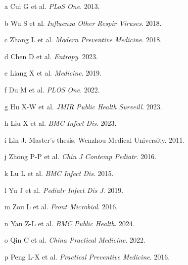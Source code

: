 \begin{landscape}
\begin{table}[htbp]
\begin{threeparttable}
\begin{tablenotes}[flushleft]
    \vspace{0.5em}
    \item [a] Cui G et al. \textit{PLoS One}. 2013. 
    \item [b] Wu S et al. \textit{Influenza Other Respir Viruses}. 2018.
    \item [c] Zhang L et al. \textit{Modern Preventive Medicine}. 2018.
    \item [d] Chen D et al. \textit{Entropy}. 2023.
    \item [e] Liang X et al. \textit{Medicine}. 2019.
    \item [f] Du M et al. \textit{PLOS One}. 2022.
    \item [g] Hu X-W et al. \textit{JMIR Public Health Surveill}. 2023.
    \item [h] Liu X et al. \textit{BMC Infect Dis}. 2023.
    \item [i] Lin J. Master's thesis, Wenzhou Medical University. 2011.
    \item [j] Zhong P-P et al. \textit{Chin J Contemp Pediatr}. 2016.
    \item [k] Lu L et al. \textit{BMC Infect Dis}. 2015.
    \item [l] Yu J et al. \textit{Pediatr Infect Dis J}. 2019.
    \item [m] Zou L et al. \textit{Front Microbiol}. 2016.
    \item [n] Yan Z-L et al. \textit{BMC Public Health}. 2024.
    \item [o] Qin C et al. \textit{China Practical Medicine}. 2022.
    \item [p] Peng L-X et al. \textit{Practical Preventive Medicine}. 2016.
    \end{tablenotes}

    \end{threeparttable}
\end{table}
\end{landscape}
